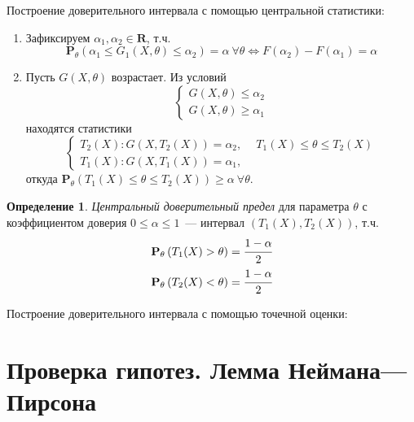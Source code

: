 \documentclass[oneside,final,14pt]{extreport}
\theoremstyle{definition}
\newtheorem{defn}{Определение}[section]
\begin{document}
Построение доверительного интервала с помощью центральной статистики:
\begin{enumerate}
    \item Зафиксируем \( \alpha_{1}, \alpha_{2} \in \mathbf{R}\), т.ч.
    \begin{equation*}
        \mathbf{P}_{\theta}(\alpha_{1} \leq G_{1}(X, \theta) \leq \alpha_{2})=\alpha~\forall \theta \Leftrightarrow F(\alpha_{2})-F(\alpha_{1})=\alpha
    \end{equation*}
    \item Пусть \(G(X,\theta)\) возрастает. Из условий
    \begin{equation*}
        \left\{\begin{array}{l}
        G(X, \theta) \leq \alpha_{2} \\
        G(X, \theta) \geq \alpha_{1}
        \end{array}\right.
    \end{equation*}
    находятся статистики
    \begin{equation*}
        \left\{\begin{array}{l}
        T_{2}(X): G\left(X, T_{2}(X)\right)=\alpha_{2}, \quad \ T_{1}(X) \leq \theta \leq T_{2}(X) \\
        T_{1}(X): G\left(X, T_{1}(X)\right)=\alpha_{1},
        \end{array}\right.
    \end{equation*}
    откуда \( \mathbf{P}_{\theta}\left(T_{1}(X) \leq \theta \leq T_{2}(X)\right) \geq \alpha~ \forall \theta \).
\end{enumerate}

\begin{defn}
{\it Центральный доверительный предел} для параметра \(\theta\) с коэффициентом доверия \(0 \leq \alpha \leq 1\)~--- интервал \((T_1(X), T_2(X))\), т.ч. 
\begin{gather*}
    \mathbf{P}_{\theta}\left(T_{1}(X)>\theta\right)=\cfrac{1-\alpha}{2} \\
    \mathbf{P}_{\theta}\left(T_{2}(X)<\theta\right)=\cfrac{1-\alpha}{2}
\end{gather*}
\end{defn}

Построение доверительного интервала с помощью точечной оценки:

\section{Проверка гипотез. Лемма Неймана—Пирсона}
\end{document}

